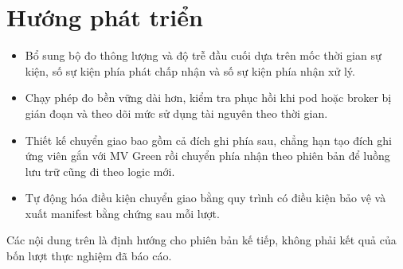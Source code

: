 \section{Hướng phát triển}
\begin{itemize}
\item Bổ sung bộ đo thông lượng và độ trễ đầu cuối dựa trên mốc thời gian sự kiện, số sự kiện phía phát chấp nhận và số sự kiện phía nhận xử lý.
\item Chạy phép đo bền vững dài hơn, kiểm tra phục hồi khi pod hoặc broker bị gián đoạn và theo dõi mức sử dụng tài nguyên theo thời gian.
\item Thiết kế chuyển giao bao gồm cả đích ghi phía sau, chẳng hạn tạo đích ghi ứng viên gắn với MV Green rồi chuyển phía nhận theo phiên bản để luồng lưu trữ cũng đi theo logic mới.
\item Tự động hóa điều kiện chuyển giao bằng quy trình có điều kiện bảo vệ và xuất manifest bằng chứng sau mỗi lượt.
\end{itemize}

Các nội dung trên là định hướng cho phiên bản kế tiếp, không phải kết quả của bốn lượt thực nghiệm đã báo cáo.
